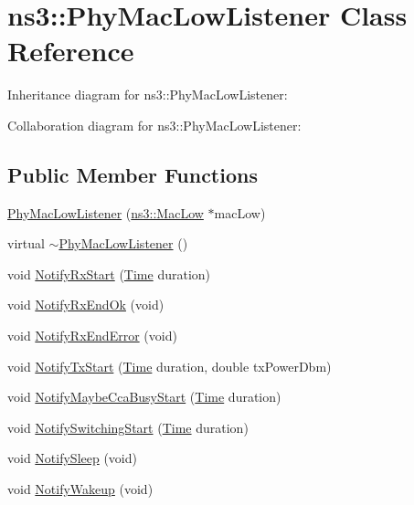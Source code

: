\hypertarget{classns3_1_1PhyMacLowListener}{}\section{ns3\+:\+:Phy\+Mac\+Low\+Listener Class Reference}
\label{classns3_1_1PhyMacLowListener}


Inheritance diagram for ns3\+:\+:Phy\+Mac\+Low\+Listener\+:


Collaboration diagram for ns3\+:\+:Phy\+Mac\+Low\+Listener\+:
\subsection*{Public Member Functions}
\begin{DoxyCompactItemize}
\item 
\hyperlink{classns3_1_1PhyMacLowListener_a1bc3564abd3951a3af6b6343e2a330fb}{Phy\+Mac\+Low\+Listener} (\hyperlink{classns3_1_1MacLow}{ns3\+::\+Mac\+Low} $\ast$mac\+Low)
\item 
virtual \hyperlink{classns3_1_1PhyMacLowListener_a36a2f7a3775eaf5001c1555c64671baf}{$\sim$\+Phy\+Mac\+Low\+Listener} ()
\item 
void \hyperlink{classns3_1_1PhyMacLowListener_a7ef6498b417cc897229053f12c677194}{Notify\+Rx\+Start} (\hyperlink{classns3_1_1Time}{Time} duration)
\item 
void \hyperlink{classns3_1_1PhyMacLowListener_a302830dc08603e98d66b5e749b35afdd}{Notify\+Rx\+End\+Ok} (void)
\item 
void \hyperlink{classns3_1_1PhyMacLowListener_ac225bcb80de9366b102b12966caabe1b}{Notify\+Rx\+End\+Error} (void)
\item 
void \hyperlink{classns3_1_1PhyMacLowListener_ad44562d3a6268b374d72abde27684dc4}{Notify\+Tx\+Start} (\hyperlink{classns3_1_1Time}{Time} duration, double tx\+Power\+Dbm)
\item 
void \hyperlink{classns3_1_1PhyMacLowListener_a7206127f5f3023daed5f01d30deb3c1e}{Notify\+Maybe\+Cca\+Busy\+Start} (\hyperlink{classns3_1_1Time}{Time} duration)
\item 
void \hyperlink{classns3_1_1PhyMacLowListener_a869b03f9f62df72e92f204c96b0119d0}{Notify\+Switching\+Start} (\hyperlink{classns3_1_1Time}{Time} duration)
\item 
void \hyperlink{classns3_1_1PhyMacLowListener_ad9effa3f5cf5f01b9d96679d3ec0c8b0}{Notify\+Sleep} (void)
\item 
void \hyperlink{classns3_1_1PhyMacLowListener_a708c891331273676e26ecf8df28fcdec}{Notify\+Wakeup} (void)
\end{DoxyCompactItemize}
